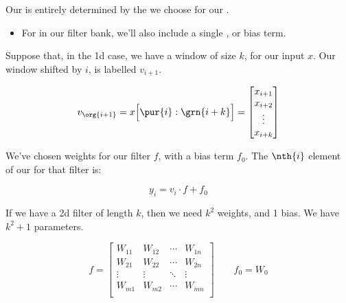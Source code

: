     

        \begin{definition}
            Our  is entirely determined by the  we choose for our .

            \begin{itemize}
                \item For  in our filter bank, we'll also include a single , or bias term.
            \end{itemize}

            \subsecdiv

            Suppose that, in the 1d case, we have a window of size $k$, for our input $x$. Our window shifted by $i$, is labelled $v_{i+1}$. 

            \begin{equation*}
                v_{\org{i+1}} = x \Big[ \pur{i}:\grn{i+k} \Big] =  
                \begin{bmatrix}
                    x_{i+1} \\ x_{i+2} \\ \vdots \\ x_{i+k}
                \end{bmatrix}
            \end{equation*}

            
            We've chosen weights for our filter $f$, with a bias term $f_0$. The $\nth{i}$ element of our  for that filter is:

            \begin{equation*}
                y_i = v_i \cdot f + f_0
            \end{equation*}
        \end{definition}

        \miniex If we have a 2d filter of length $k$, then we need $k^2$ weights, and 1 bias. We have $k^2+1$ parameters.

        \begin{equation}
            f = 
            \begin{bmatrix}
                W_{11} & W_{12} & \cdots & W_{1n} \\
                W_{21} & W_{22} & \cdots & W_{2n} \\
                \vdots & \vdots & \ddots & \vdots \\
                W_{m1} & W_{m2} & \cdots & W_{mn} \\
            \end{bmatrix}
            \qquad
            f_0 = W_{0}
        \end{equation}


